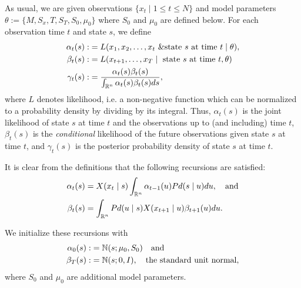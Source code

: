 \documentclass[12pt,leqno]{article}
\begin{document}
As usual, we are given observations $\{x_t\mid 1\le t\le N\}$ and model parameters $\theta := \{M,S_x,T,S_T,S_0,\mu_0\}$
where $S_0$ and $\mu_0$ are defined below.  For each observation time $t$ and state $s$, we define
\begin{align*}
  \alpha_t(s) :&= L(x_1,x_2,\dots,x_t~ \& \text{state $s$ at time $t$}\mid \theta ),\\
  \beta_t(s) :&= L(x_{t+1},\dots,x_T \mid ~\text{state $s$ at time $t$},\theta)\\
  \gamma_t(s) :&= \frac{\alpha_t(s)\beta_t(s)}{\int_{{\mathbb R}^n}\alpha_t(s)\beta_t(s)ds},
\end{align*}
where $L$ denotes likelihood, i.e. a non-negative function which can be normalized to a probability density by dividing
by its integral.
Thus, $\alpha_t(s)$ is the joint likelihood of state $s$ at time $t$ and the observations up to (and including) time $t$,
$\beta_t(s)$ is the {\em conditional} likelihood of the future observations given state $s$ at time $t$, and $\gamma_t(s)$
is the posterior probability density of state $s$ at time $t$.

It is clear from the definitions that the following recursions are satisfied:
\begin{align}
\alpha_t(s) &= X(x_t \mid s)\int_{{\mathbb R}^n}\alpha_{t-1}(u)Pd(s \mid u)du,\quad\text{and}\label{alpha:0}\\
\beta_t(s) &= \int_{{\mathbb R}^{n}}Pd(u \mid s)X(x_{t+1} \mid u)\beta_{t+1}(u)du.\label{beta:0}
\end{align}

We initialize these recursions with
\begin{align*}
\alpha_0(s) :&= {\mathbb N}(s;\mu_0,S_0)\quad\text{and} \\
\beta_{T}(s) :&= {\mathbb N}(s;0,I), \quad\text{the standard unit normal},
\end{align*}
where $S_0$ and $\mu_0$ are additional model parameters.
\end{document}
